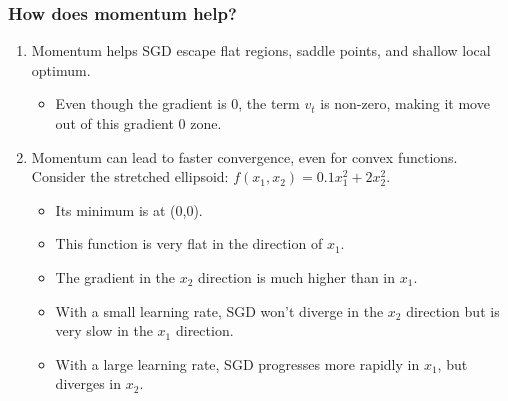     \subsubsection{How does momentum help?}
    \begin{intuition}
        \begin{enumerate}
            \item Momentum helps SGD escape flat regions, saddle points, and shallow local optimum. 
                \begin{itemize}
                    \item Even though the gradient is $0$, the term $v_t$ is non-zero, making it move out of this gradient 0 zone. 
                \end{itemize}
            \item Momentum can lead to faster convergence, even for convex functions. Consider the stretched ellipsoid: \(f(x_1, x_2) = 0.1x_1^2 + 2x_2^2.\)

            \begin{itemize}
                \item Its minimum is at (0,0).
                \item This function is very flat in the direction of \(x_1\).
                \item The gradient in the \(x_2\) direction is much higher than in \(x_1\).
                \item With a small learning rate, SGD won’t diverge in the \(x_2\) direction but is very slow in the \(x_1\) direction.
                \item With a large learning rate, SGD progresses more rapidly in \(x_1\), but diverges in \(x_2\).
            \end{itemize}
        \end{enumerate}
    \end{intuition}

